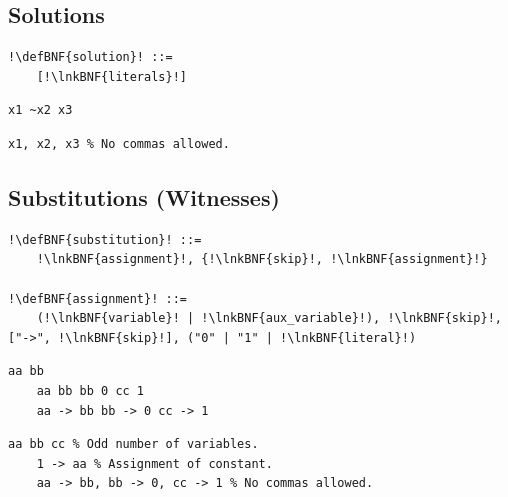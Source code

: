 \documentclass[a4paper]{article}
\newcommand{\defBNF}[1]{\hypertarget{def:#1}{<\detokenize{#1}>}}
\newcommand{\lnkBNF}[1]{\hyperlink{def:#1}{<\detokenize{#1}>}}
\begin{document}
\subsection{Solutions}\label{sec:solutions}
\begin{lstlisting}
!\defBNF{solution}! ::=
	[!\lnkBNF{literals}!]
\end{lstlisting}
\begin{minipage}{.49\linewidth}
	\begin{lstlisting}[language=veripb, gobble=4, rulecolor=\color{veripb-valid-text}, caption={Syntactically correct solution.}]
	x1 ~x2 x3
	\end{lstlisting}
\end{minipage}\hfill%
\begin{minipage}{.49\linewidth}
	\begin{lstlisting}[language=veripb, gobble=4, rulecolor=\color{veripb-invalid-text}, caption={Syntactically incorrect solution.}]
	x1, x2, x3 % No commas allowed.
	\end{lstlisting}
\end{minipage}


\subsection{Substitutions (Witnesses)}\label{sec:substitutions}
\begin{lstlisting}
!\defBNF{substitution}! ::=
	!\lnkBNF{assignment}!, {!\lnkBNF{skip}!, !\lnkBNF{assignment}!}

!\defBNF{assignment}! ::=
	(!\lnkBNF{variable}! | !\lnkBNF{aux_variable}!), !\lnkBNF{skip}!, ["->", !\lnkBNF{skip}!], ("0" | "1" | !\lnkBNF{literal}!)
\end{lstlisting}
\begin{minipage}{.49\linewidth}
	\begin{lstlisting}[language=veripb, gobble=4, rulecolor=\color{veripb-valid-text}, caption={Syntactically correct substitutions.}]
	aa bb
	aa bb bb 0 cc 1
	aa -> bb bb -> 0 cc -> 1
	\end{lstlisting}
\end{minipage}\hfill%
\begin{minipage}{.49\linewidth}
	\begin{lstlisting}[language=veripb, gobble=4, rulecolor=\color{veripb-invalid-text}, caption={Syntactically incorrect substitutions.}]
	aa bb cc % Odd number of variables.
	1 -> aa % Assignment of constant.
	aa -> bb, bb -> 0, cc -> 1 % No commas allowed.
	\end{lstlisting}
\end{minipage}
\end{document}
